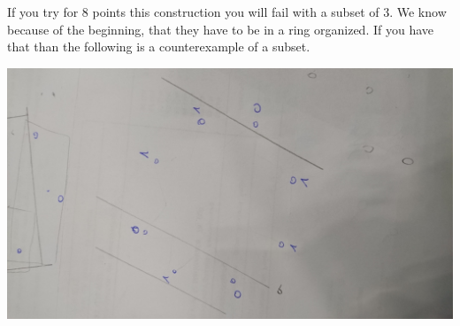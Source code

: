 \documentclass{article}
\begin{document}
If you try for 8 points this construction you will fail with a subset of 3. We
know because of the beginning, that they have to be in a ring organized. If you
have that than the following is a counterexample of a subset.

\includegraphics[width=.6\linewidth]{22.jpg}
\end{document}
